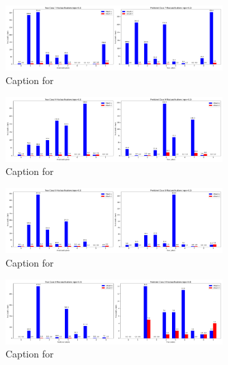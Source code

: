\documentclass{article}
\begin{document}
\begin{figure}[!htbp]
\centering
\includegraphics[width=0.75\textwidth]{combined_class_boundary_pgd/combined_class_7_misclassifications_eps_0.3.png}
\caption{Caption for }
\label{fig:combined_class_7_misclassifications_eps_0.3.png}
\end{figure}

\begin{figure}[!htbp]
\centering
\includegraphics[width=0.75\textwidth]{combined_class_boundary_pgd/combined_class_9_misclassifications_eps_0.3.png}
\caption{Caption for }
\label{fig:combined_class_9_misclassifications_eps_0.3.png}
\end{figure}

\begin{figure}[!htbp]
\centering
\includegraphics[width=0.75\textwidth]{combined_class_boundary_pgd/combined_class_8_misclassifications_eps_0.3.png}
\caption{Caption for }
\label{fig:combined_class_8_misclassifications_eps_0.3.png}
\end{figure}


\begin{figure}[!htbp]
\centering
\includegraphics[width=0.75\textwidth]{combined_class_boundary_pgd/combined_class_0_misclassifications_eps_0.4.png}
\caption{Caption for }
\label{fig:combined_class_0_misclassifications_eps_0.4.png}
\end{figure}
\end{document}
